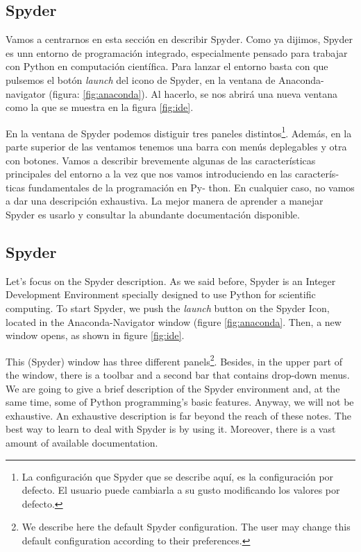 \begin{paracol}{2}
\subsection{Spyder}
Vamos a centrarnos en esta sección en describir Spyder. Como ya dijimos, Spyder es unn entorno de programación integrado, especialmente pensado para trabajar con Python en computación científica. Para lanzar el entorno basta con que pulsemos el botón \emph{launch} del icono de Spyder, en la ventana de Anaconda-navigator (figura: \ref{fig:anaconda}). Al hacerlo, se nos abrirá una nueva ventana como la que se muestra en la figura \ref{fig:ide}.

En la ventana de Spyder podemos distiguir tres paneles distintos\footnote{La configuración que Spyder que se describe  aquí, es la configuración por defecto. El usuario puede cambiarla a su gusto modificando los valores por defecto.}. Además, en la  parte superior de las ventamos tenemos una barra con menús deplegables y otra con botones. Vamos a describir brevemente algunas de las características principales del entorno a la vez que nos vamos introduciendo en las caracterís- ticas fundamentales de la programación en Py- thon. En cualquier caso, no vamos a dar una descripción exhaustiva. La mejor manera de aprender a manejar Spyder es usarlo y consultar la abundante documentación disponible.
\switchcolumn

\subsection{Spyder}
Let's focus on the Spyder description. As we said before, Spyder is an Integer Development Environment specially designed to use Python for scientific computing. To start Spyder, we push the \emph{launch} button on the Spyder Icon, located in the Anaconda-Navigator window (figure \ref{fig:anaconda}. Then, a new window opens, as shown in figure \ref{fig:ide}.

This (Spyder) window has three different panels\footnote{We describe here the default Spyder configuration. The user may change this default configuration according to their preferences.}. Besides, in the upper part of the window, there is a toolbar and a second bar that contains drop-down menus. We are going to give a brief description of the Spyder environment and, at the same time, some of Python programming's basic features. Anyway, we will not be exhaustive. An exhaustive description is far beyond the reach of these notes. The best way to learn to deal with Spyder is by using it. Moreover, there is a vast amount of available documentation.
\end{paracol}


